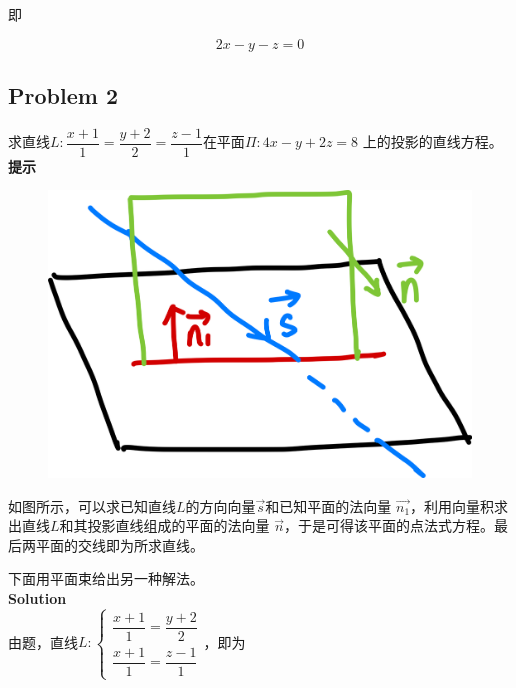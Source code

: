\documentclass[
	11pt, %
	a4paper, %
]{WhuSakuraBook}
\begin{document}
    即

    \[
        2x-y-z=0
    \]

\subsection{Problem 2}

    求直线$L: \dfrac{x+1}{1}=\dfrac{y+2}{2}=\dfrac{z-1}{1}$在平面\(\Pi: 4x-y + 2z = 8\)
    上的投影的直线方程。
    \\

    \textbf{提示}
    \\

    \begin{figure}
        \centering
        \includegraphics[scale=0.06]{"Chapter 08 images/pic20.png"}
        \label{pic20}
    \end{figure}

    如图所示，可以求已知直线\(L\)的方向向量\(\overrightarrow{s}\)和已知平面的法向量
    \(\overrightarrow{n_1}\)，利用向量积求出直线\(L\)和其投影直线组成的平面的法向量
    \(\overrightarrow{n}\)，于是可得该平面的点法式方程。最后两平面的交线即为所求直线。

    下面用平面束给出另一种解法。
    \\

    \textbf{Solution}
    \\

    由题，直线\(L: \left\{\begin{array}{l}\dfrac{x+1}{1}=\dfrac{y+2}{2} \\
    \dfrac{x+1}{1}=\dfrac{z-1}{1}\end{array}\right.\)，即为
\end{document}
